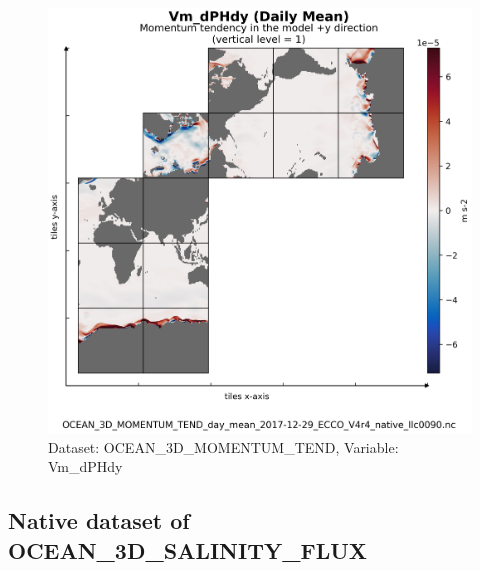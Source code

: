 \begin{figure}[H]
\centering
\includegraphics[scale=0.55]{../images/plots/v4r4/native_plots/Ocean_Three-Dimensional_Momentum_Tendency/Vm_dPHdy.png}
\caption{Dataset: OCEAN\_3D\_MOMENTUM\_TEND, Variable: Vm\_dPHdy}
\label{tab:table-OCEAN_3D_MOMENTUM_TEND_Vm_dPHdy-Plot}
\end{figure}
\newpage
\subsection{Native dataset of OCEAN\_3D\_SALINITY\_FLUX}
\newp
